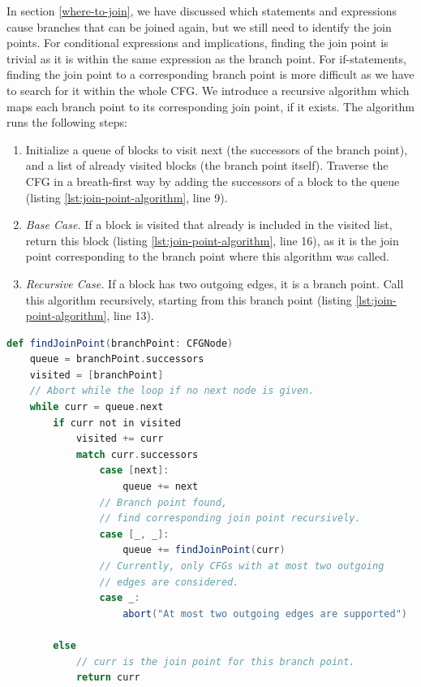 \documentclass[11pt]{article}
\begin{document}
    In section \ref{where-to-join}, we have discussed which statements and expressions cause
    branches that can be joined again, but we still need to identify the join points.
    For conditional expressions and implications, finding the join point is trivial
    as it is within the same expression as the branch point.
    For if-statements, finding the join point to a corresponding branch point is more 
    difficult as we have to search
    for it within the whole CFG.
    We introduce a recursive algorithm which maps each branch point to its corresponding join point,
    if it exists. The algorithm runs the following steps:

    \begin{enumerate}
        \item Initialize a queue of blocks to visit next (the successors of the branch point),
            and a list of already visited blocks (the branch point itself).
            Traverse the CFG in a breath-first way by adding the successors of a block
            to the queue (listing \ref{lst:join-point-algorithm}, line 9).
        \item \emph{Base Case.} If a block is visited that already is included in the visited list,
            return this block (listing \ref{lst:join-point-algorithm}, line 16), as it is the join point corresponding to the branch point where this algorithm was called.
        \item \emph{Recursive Case.} If a block has two outgoing edges, it is a branch point.
            Call this algorithm recursively, starting from this branch point (listing \ref{lst:join-point-algorithm}, line 13).
    \end{enumerate}

    \begin{lstlisting}[language=Scala, caption={The join point finding algorithm without support for loops.}, label={lst:join-point-algorithm}]
def findJoinPoint(branchPoint: CFGNode)
    queue = branchPoint.successors
    visited = [branchPoint]
    // Abort while the loop if no next node is given.
    while curr = queue.next
        if curr not in visited
            visited += curr
            match curr.successors
                case [next]:
                    queue += next
                // Branch point found,
                // find corresponding join point recursively.
                case [_, _]:
                    queue += findJoinPoint(curr)
                // Currently, only CFGs with at most two outgoing
                // edges are considered.
                case _:
                    abort("At most two outgoing edges are supported")

        else
            // curr is the join point for this branch point.
            return curr

    
        
    \end{lstlisting}
\end{document}
